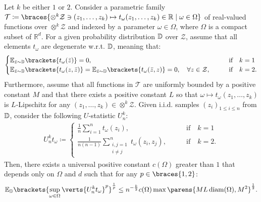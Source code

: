 \begin{theorem}\label{prop:maximal_ineq_degenerate_u_process}
	Let $k$ be either $1$ or $2$. 
Consider a parametric family 
	$\mathcal{T}\coloneqq \braces{\otimes^{k} \mathcal{Z}\ni (z_1,\ldots,z_k)\mapsto t_{\omega}(z_1,\ldots,z_k)\in \mathbb{R}\mid\omega \in \Omega}$ 
	of real-valued functions over $\otimes^{k} \mathcal{Z}$ and indexed by a parameter $\omega\in \Omega$, where $\Omega$ is a compact subset of $\mathbb{R}^d$. 
	For a given probability distribution $\mathbb{D}$ over $\mathcal{Z}$, assume that all elements $t_{\omega}$ are degenerate w.r.t. $\mathbb{D}$, meaning that:
	\begin{align*}
		\begin{cases}
		\mathbb{E}_{\bar{z}\sim \PP}\brackets{ t_{\omega}(\bar{z})} = 0, &\qquad \text{if} \quad k=1\\ 
			\mathbb{E}_{\bar{z}\sim \PP}\brackets{ t_{\omega}(z,\bar{z})} =\mathbb{E}_{\bar{z}\sim \PP}\brackets{ t_{\omega}(\bar{z},z)}=0,\quad \forall z\in \mathcal{Z}, &\qquad \text{if} \quad k=2. 
		\end{cases}
	\end{align*}
	Furthermore, assume that all functions in $\mathcal{T}$ are uniformly bounded by a positive constant $M$ and that there exists a positive constant $L$ so that $\omega \mapsto t_{\omega}(z_1,\ldots,z_k)$ is $L$-Lipschitz for any $(z_1,\ldots,z_k)\in \otimes^k \mathcal{Z}$.  
	 Given i.i.d. samples $(z_i)_{1\leq i\leq n}$ from $\mathbb{D}$, consider the following $U$-statistic $U_n^k$:
\begin{align*}
    U_n^k t_\omega\coloneqq 
    \begin{cases}
    	    	\frac{1}{n}\sum_{i=1}^n t_{\omega}(z_i),&\qquad \text{if} \quad k=1\\
    	\frac{1}{n(n-1)}\sum_{\substack{i,j=1\\ i\neq j}}^n t_{\omega}(z_i,z_j),&\qquad \text{if} \quad k=2.
    \end{cases}
\end{align*}
Then, there exists a universal positive constant $c(\Omega)$ greater than $1$ that depends only on $\Omega$ and $d$ such that for any $p\in \braces{1,2}$:
\begin{align*}
	\mathbb{E}_{\PP}\brackets{\sup_{\omega\in \Omega} \verts{U^k_n t_{\omega}}^p}^{\frac{1}{p}}\leq n^{-{\frac{k}{2}}}  c(\Omega)\max\parens{ML\diam(\Omega),M^2}^{\frac{1}{2}}.
\end{align*}


\end{theorem}
